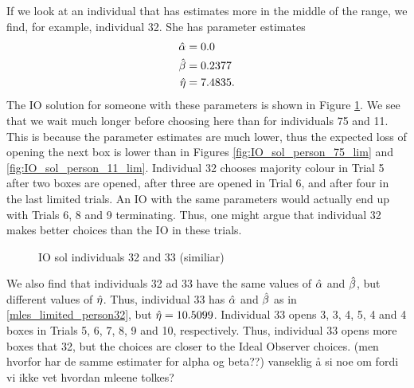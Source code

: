 If we look at an individual that has estimates more in the middle of the range, we find, for example, individual 32. She has parameter estimates
\begin{equation}
\label{mles_limited_person32}
    \begin{aligned}
        \hat{\alpha} &= 0.0\\
        \hat{\beta} &= 0.2377\\
        \hat{\eta} &= 7.4835.
    \end{aligned}
\end{equation}
The IO solution for someone with these parameters is shown in Figure \ref{fig:IO_sol_lim_person32and33}. We see that we wait much longer before choosing here than for individuals 75 and 11. This is because the parameter estimates are much lower, thus the expected loss of opening the next box is lower than in Figures \ref{fig:IO_sol_person_75_lim} and \ref{fig:IO_sol_person_11_lim}.
Individual 32 chooses majority colour in Trial 5 after two boxes are opened, after three are opened in Trial 6, and after four in the last limited trials. An IO with the same parameters would actually end up with Trials 6, 8 and 9 terminating. Thus, one might argue that individual 32 makes better choices than the IO in these trials. 
\begin{figure}
    \centering
    \scalebox{0.7}{}
    \caption{IO sol individuals 32 and 33 (similiar)}
    \label{fig:IO_sol_lim_person32and33}
\end{figure}


We also find that individuals 32 ad 33  have the same values of $\hat{\alpha}$ and $\hat{\beta}$, but different values of $\hat{\eta}$. Thus, individual 33 has $\hat{\alpha}$ and $\hat{\beta}$ as in \eqref{mles_limited_person32}, but $\hat{\eta}=10.5099$. Individual 33 opens 3, 3, 4, 5, 4 and 4 boxes in Trials 5, 6, 7, 8, 9 and 10, respectively. Thus, individual 33 opens more boxes that 32, but the choices are closer to the Ideal Observer choices. (men hvorfor har de samme estimater for alpha og beta??)
vanseklig å si noe om fordi vi ikke vet hvordan mleene tolkes?












